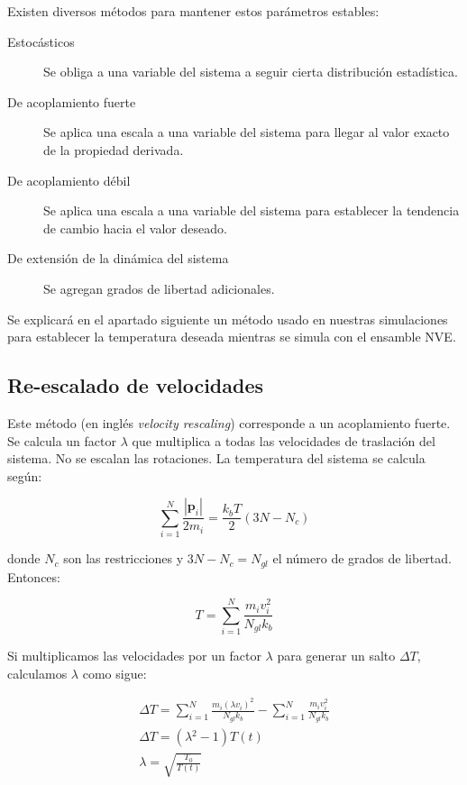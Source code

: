 Existen diversos métodos para mantener estos parámetros estables:

\begin{description}
	\item[Estocásticos] Se obliga a una variable del sistema a seguir cierta distribución estadística.
	\item[De acoplamiento fuerte] Se aplica una escala a una variable del sistema para llegar al valor exacto de la propiedad derivada.
	\item[De acoplamiento débil] Se aplica una escala a una variable del sistema para establecer la tendencia de cambio hacia el valor deseado.
	\item[De extensión de la dinámica del sistema] Se agregan grados de libertad adicionales.
\end{description}

Se explicará en el apartado siguiente un método usado en nuestras simulaciones para establecer la temperatura deseada mientras se simula con el ensamble NVE.

\subsection{Re-escalado de velocidades}
\label{S2_5_1}
Este método (en inglés \textit{velocity rescaling}) corresponde a un acoplamiento fuerte. Se calcula un factor $\lambda$ que multiplica a todas las velocidades de traslación del sistema. No se escalan las rotaciones. La temperatura del sistema se calcula según:

\begin{equation}
\sum_{i=1}^{N}\frac{|\mathbf{p}_{i}|}{2m_{i}} = \frac{k_{b}T}{2}(3N-N_{c})
\end{equation}

donde $N_{c}$ son las restricciones y $3N-N_{c} = N_{gl}$ el número de grados de libertad. Entonces:

\begin{equation}
T = \sum_{i=1}^{N}\frac{m_{i}v_{i}^{2}}{N_{gl}k_{b}}
\end{equation}

Si multiplicamos las velocidades por un factor $\lambda$ para generar un salto $\Delta{}T$, calculamos $\lambda$ como sigue:

\begin{eqnarray}
\Delta{}T = \sum_{i=1}^{N}\frac{m_{i}(\lambda{}v_{i})^{2}}{N_{gl}k_{b}} - \sum_{i=1}^{N}\frac{m_{i}v_{i}^{2}}{N_{gl}k_{b}}\\
\Delta{}T = (\lambda{}^{2}-1)T(t)\\
\lambda{} = \sqrt{\frac{T_{0}}{T(t)}}
\end{eqnarray} 